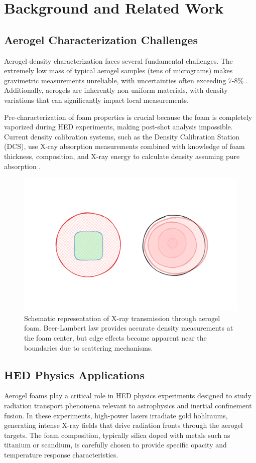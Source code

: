 \documentclass[twocolumn]{aastex701}
\begin{document}
\section{Background and Related Work}

\subsection{Aerogel Characterization Challenges}

Aerogel density characterization faces several fundamental challenges. The extremely low mass of typical aerogel samples (tens of micrograms) makes gravimetric measurements unreliable, with uncertainties often exceeding 7-8\% \citep{Lanier_Hamilton_Taccetti_2012}. Additionally, aerogels are inherently non-uniform materials, with density variations that can significantly impact local measurements.

Pre-characterization of foam properties is crucial because the foam is completely vaporized during HED experiments, making post-shot analysis impossible. Current density calibration systems, such as the Density Calibration Station (DCS), use X-ray absorption measurements combined with knowledge of foam thickness, composition, and X-ray energy to calculate density assuming pure absorption \citep{Johns_Fryer_Wood_Fontes_Kozlowski_Lanier_Liao_Perry_Morton_Brown_et_al._2021}.

\begin{figure}[t]
    \centering
    \includegraphics[width=0.45\linewidth]{circular.png}
    \caption{Schematic representation of X-ray transmission through aerogel foam. Beer-Lambert law provides accurate density measurements at the foam center, but edge effects become apparent near the boundaries due to scattering mechanisms.}
    \label{fig:circle}
\end{figure}

\subsection{HED Physics Applications}

Aerogel foams play a critical role in HED physics experiments designed to study radiation transport phenomena relevant to astrophysics and inertial confinement fusion. In these experiments, high-power lasers irradiate gold hohlraums, generating intense X-ray fields that drive radiation fronts through the aerogel targets. The foam composition, typically silica doped with metals such as titanium or scandium, is carefully chosen to provide specific opacity and temperature response characteristics.
\end{document}
